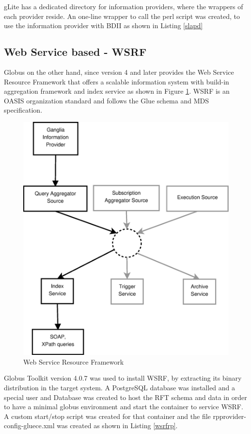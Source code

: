 gLite has a dedicated directory for information providers, where the wrappers of each provider reside. An one-line wrapper to call the perl script was created, to use the information provider with \ac{BDII} as shown in Listing \ref{slapd}

\subsection{Web Service based - WSRF}

Globus on the other hand, since version 4 and later provides the Web Service Resource Framework that offers a scalable information system with build-in aggregation framework and index service as shown in Figure \ref{figure:wsrf}. \ac{WSRF} is an \ac{OASIS} organization standard and follows the Glue schema and MDS specification.

\begin{figure}[htb]
\centering
 \includegraphics[width=120mm]{images/wsrf.eps}
\caption{Web Service Resource Framework}
\label{figure:wsrf}
\end{figure}

Globus Toolkit version 4.0.7 was used to install \ac{WSRF}, by extracting its binary distribution in the target system. A PostgreSQL database was installed and a special user and Database was created to host the \ac{RFT} schema and data in order to have a minimal globus environment and start the container to service \ac{WSRF}. A custom start/stop script was created for that container and the file rpprovider-config-gluece.xml was created as shown in Listing \ref{wsrfrp}.

